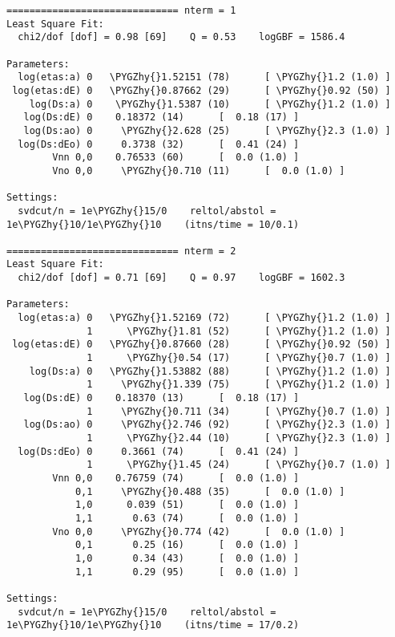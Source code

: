 \documentclass[letterpaper,10pt,english]{sphinxmanual}
\def\PYGZhy{\char`\-}
\begin{document}
\begin{itemize}
\begin{Verbatim}[commandchars=\\\{\}]
============================== nterm = 1
Least Square Fit:
  chi2/dof [dof] = 0.98 [69]    Q = 0.53    logGBF = 1586.4

Parameters:
  log(etas:a) 0   \PYGZhy{}1.52151 (78)      [ \PYGZhy{}1.2 (1.0) ]  
 log(etas:dE) 0   \PYGZhy{}0.87662 (29)      [ \PYGZhy{}0.92 (50) ]  
    log(Ds:a) 0    \PYGZhy{}1.5387 (10)      [ \PYGZhy{}1.2 (1.0) ]  
   log(Ds:dE) 0    0.18372 (14)      [  0.18 (17) ]  
   log(Ds:ao) 0     \PYGZhy{}2.628 (25)      [ \PYGZhy{}2.3 (1.0) ]  
  log(Ds:dEo) 0     0.3738 (32)      [  0.41 (24) ]  
        Vnn 0,0    0.76533 (60)      [  0.0 (1.0) ]  
        Vno 0,0     \PYGZhy{}0.710 (11)      [  0.0 (1.0) ]  

Settings:
  svdcut/n = 1e\PYGZhy{}15/0    reltol/abstol = 1e\PYGZhy{}10/1e\PYGZhy{}10    (itns/time = 10/0.1)

============================== nterm = 2
Least Square Fit:
  chi2/dof [dof] = 0.71 [69]    Q = 0.97    logGBF = 1602.3

Parameters:
  log(etas:a) 0   \PYGZhy{}1.52169 (72)      [ \PYGZhy{}1.2 (1.0) ]  
              1      \PYGZhy{}1.81 (52)      [ \PYGZhy{}1.2 (1.0) ]  
 log(etas:dE) 0   \PYGZhy{}0.87660 (28)      [ \PYGZhy{}0.92 (50) ]  
              1      \PYGZhy{}0.54 (17)      [ \PYGZhy{}0.7 (1.0) ]  
    log(Ds:a) 0   \PYGZhy{}1.53882 (88)      [ \PYGZhy{}1.2 (1.0) ]  
              1     \PYGZhy{}1.339 (75)      [ \PYGZhy{}1.2 (1.0) ]  
   log(Ds:dE) 0    0.18370 (13)      [  0.18 (17) ]  
              1     \PYGZhy{}0.711 (34)      [ \PYGZhy{}0.7 (1.0) ]  
   log(Ds:ao) 0     \PYGZhy{}2.746 (92)      [ \PYGZhy{}2.3 (1.0) ]  
              1      \PYGZhy{}2.44 (10)      [ \PYGZhy{}2.3 (1.0) ]  
  log(Ds:dEo) 0     0.3661 (74)      [  0.41 (24) ]  
              1      \PYGZhy{}1.45 (24)      [ \PYGZhy{}0.7 (1.0) ]  
        Vnn 0,0    0.76759 (74)      [  0.0 (1.0) ]  
            0,1     \PYGZhy{}0.488 (35)      [  0.0 (1.0) ]  
            1,0      0.039 (51)      [  0.0 (1.0) ]  
            1,1       0.63 (74)      [  0.0 (1.0) ]  
        Vno 0,0     \PYGZhy{}0.774 (42)      [  0.0 (1.0) ]  
            0,1       0.25 (16)      [  0.0 (1.0) ]  
            1,0       0.34 (43)      [  0.0 (1.0) ]  
            1,1       0.29 (95)      [  0.0 (1.0) ]  

Settings:
  svdcut/n = 1e\PYGZhy{}15/0    reltol/abstol = 1e\PYGZhy{}10/1e\PYGZhy{}10    (itns/time = 17/0.2)


\end{Verbatim}
\end{itemize}
\end{document}
